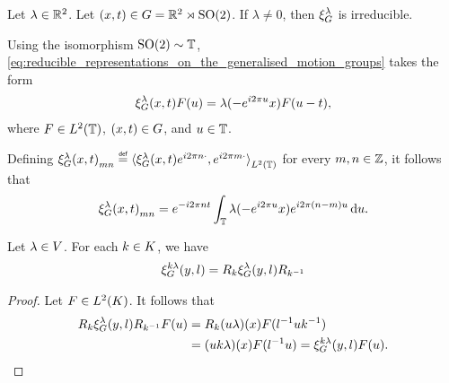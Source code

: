 \begin{example}
    Let $\lambda \in \mathbb{R}^2$.
    Let $(x, t) \in G = \mathbb{R}^2 \rtimes {\mathrm{SO} (2)}$.
    If $\lambda \neq 0$, then $\xi^{\lambda}_{G}$ is irreducible.

    Using the isomorphism ${\mathrm{SO} (2)} \sim \mathbb{T}$,
    \eqref{eq:reducible_representations_on_the_generalised_motion_groups} takes the form
    \begin{align*}
        \xi^{\lambda}_{G}(x, t) F(u)
        = \lambda(-e^{i 2 \pi u}x) F(u - t),
    \end{align*}
    where $F \in {L^{2} (\mathbb{T})}$, $(x, t) \in G$, and $u \in \mathbb{T}$.

    Defining ${\Rep\lambda(x, t)}_{m n} \defeq \ip[\Lebesgue{2}\T]{\Rep\lambda(x, t) \e^{\i \turn n \dummy}}{\e^{\i \turn m \dummy}}$ for every $m, n \in \mathbb{Z}$,
    it follows that
    \begin{align*}
        {\xi^{\lambda}_{G}(x, t)}_{m n}
        = e^{-i 2 \pi n t} \int_{\mathbb{T}} \lambda(-e^{i 2 \pi u}x) e^{i 2 \pi (n - m)u} \,\mathrm{d} u.
    \end{align*}
\end{example}

\begin{lemma}
    Let $\lambda \in V$.
    For each $k \in K$, we have
    \begin{align*}
        \xi^{k \lambda}_{G}(y, l) = R_k \xi^{\lambda}_{G}(y, l) R_{k^{-1}}
    \end{align*}
\end{lemma}
\begin{proof}
    Let $F \in {L^{2} (K)}$.
    It follows that
    \begin{align*}
        R_k \xi^{\lambda}_{G}(y, l) R_{k^{-1}} F(u)
        &= R_k (u \lambda)(x) F(l^{-1} u k^{-1})\\
        &= (u k \lambda)(x) F(l^{-1} u)
        = \xi^{k \lambda}_{G}(y, l) F(u).
    \end{align*}
\end{proof}

